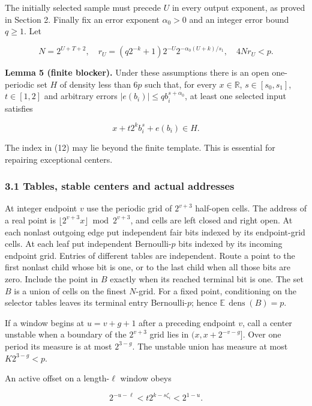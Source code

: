 \documentclass[
  11pt,
]{article}
\begin{document}
The initially selected sample must precede \(U\) in every output
exponent, as proved in Section 2. Finally fix an error exponent
\(\alpha _0>0\) and an integer error bound \(q\ge 1\). Let

\[
 N=2^{U+T+2},\quad
 r_U=(q2^{-k}+1)2^{-U}2^{-\alpha_0(U+k)/s_1},\quad
 4Nr_U<p.                                                 \tag{11}
\]

\textbf{Lemma 5 (finite blocker).} Under these assumptions there is an
open one-periodic set \(H\) of density less than \(6p\) such that, for
every \(x\in\mathbb R\), \(s\in [s_0,s_1]\), \(t\in [1,2]\) and
arbitrary errors \(|e(b_i)|\le q b_i^{s+\alpha _0}\), at least one
selected input satisfies

\[
 x+t2^k b_i^s+e(b_i)\in H.                                 \tag{12}
\]

The index in (12) may lie beyond the finite template. This is essential
for repairing exceptional centers.

\subsubsection{3.1 Tables, stable centers and actual
addresses}\label{tables-stable-centers-and-actual-addresses}

At integer endpoint \(v\) use the periodic grid of \(2^{v+3}\) half-open
cells. The address of a real point is
\(\lfloor2^{v+3}x\rfloor\bmod 2^{v+3}\), and cells are left closed and
right open. At each nonlast outgoing edge put independent fair bits
indexed by its endpoint-grid cells. At each leaf put independent
Bernoulli-\(p\) bits indexed by its incoming endpoint grid. Entries of
different tables are independent. Route a point to the first nonlast
child whose bit is one, or to the last child when all those bits are
zero. Include the point in \(B\) exactly when its reached terminal bit
is one. The set \(B\) is a union of cells on the finest \(N\)-grid. For
a fixed point, conditioning on the selector tables leaves its terminal
entry Bernoulli-\(p\); hence \(\mathbb E\,\operatorname{dens}(B)=p\).

If a window begins at \(u=v+g+1\) after a preceding endpoint \(v\), call
a center unstable when a boundary of the \(2^{v+3}\) grid lies in
\((x,x+2^{-v-g}]\). Over one period its measure is at most \(2^{3-g}\).
The unstable union has measure at most \(K2^{3-g}<p\).

An active offset on a length-\(\ell\) window obeys

\[
 2^{-u-\ell}<t2^{k-s\zeta_i}<2^{1-u}.                     \tag{13}
\]
\end{document}

